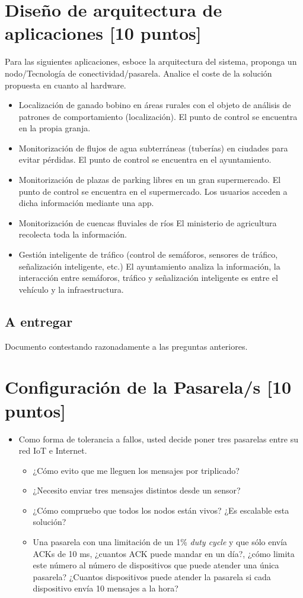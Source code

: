 \section{Diseño de arquitectura de aplicaciones [10 puntos]}
Para las siguientes aplicaciones, esboce la arquitectura del sistema, proponga un nodo/Tecnología de conectividad/pasarela. Analice el coste de la solución propuesta en cuanto al hardware.
\begin{itemize}
\item Localización de ganado bobino en áreas rurales con el objeto de análisis de patrones de comportamiento (localización). El punto de control se encuentra en la propia granja.
\item Monitorización de flujos de agua subterráneas (tuberías) en ciudades para evitar pérdidas. El punto de control se encuentra en el ayuntamiento.
\item Monitorización de plazas de parking libres en un gran supermercado. El punto de control se encuentra en el supermercado. Los usuarios acceden a dicha información mediante una app.
\item Monitorización de cuencas fluviales de ríos El ministerio de agricultura recolecta toda la información.
\item Gestión inteligente de tráfico (control de semáforos, sensores de tráfico, señalización inteligente, etc.) El ayuntamiento analiza la información, la interacción entre semáforos, tráfico y señalización inteligente es entre el vehículo y la infraestructura.
\end{itemize}

\subsection{A entregar}
Documento contestando razonadamente a las preguntas anteriores.

\section{Configuración de la Pasarela/s [10 puntos]}
\begin{itemize}
\item Como forma de tolerancia a fallos, usted decide poner tres pasarelas entre su red IoT e Internet.
  \begin{itemize}
  \item ¿Cómo evito que me lleguen los mensajes por triplicado?
  \item ¿Necesito enviar tres mensajes distintos desde un sensor?
  \item ¿Cómo compruebo que todos los nodos están vivos? ¿Es escalable esta solución?
  \item Una pasarela con una limitación de un 1\% \emph{duty cycle} y que sólo envía ACKs de 10 ms, ¿cuantos ACK puede mandar en un día?, ¿cómo limita este número al número de dispositivos que puede atender una única pasarela? ¿Cuantos dispositivos puede atender la pasarela si cada dispositivo envía 10 mensajes a la hora?
  \end{itemize}
\end{itemize}

